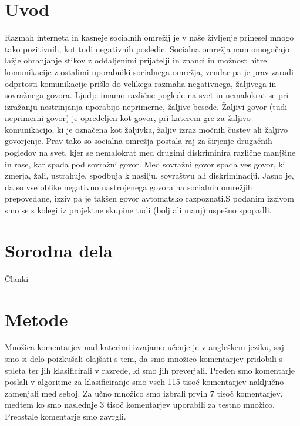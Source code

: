 \documentclass{acm_proc_article-sp}
\begin{document}

\section{Uvod}
Razmah interneta in kasneje socialnih omrežij je v naše življenje prinesel mnogo tako pozitivnih, kot tudi negativnih posledic. Socialna omrežja nam omogočajo lažje ohranjanje stikov z oddaljenimi prijatelji in znanci in možnost hitre komunikacije z ostalimi uporabniki socialnega omrežja, vendar pa je prav zaradi odprtosti komunikacije prišlo do velikega razmaha negativnega, žaljivega in sovražnega govora. Ljudje imamo različne poglede na svet in nemalokrat se pri izražanju nestrinjanja uporabijo neprimerne, žaljive besede. Žaljivi govor (tudi neprimerni govor) je opredeljen kot govor, pri katerem gre za žaljivo komunikacijo, ki je označena kot žaljivka, žaljiv izraz močnih čustev ali žaljivo govorjenje. Prav tako so socialna omrežja postala raj za širjenje drugačnih pogledov na svet, kjer se nemalokrat med drugimi diskriminira različne manjšine in rase, kar spada pod sovražni govor.  Med sovražni govor spada ves govor, ki zmerja, žali, ustrahuje, spodbuja k nasilju, sovraštvu ali diskriminaciji. Jasno je, da so vse oblike negativno nastrojenega govora na socialnih omrežjih prepovedane, izziv pa je takšen govor avtomatsko razpoznati.S podanim izzivom smo se s kolegi iz projektne skupine tudi (bolj ali manj) uspešno spopadli.

\section{Sorodna dela}
Članki~\cite{Burnap2016, Chen:2012:DOL:2411131.2411739, POI3:POI385}

\section{Metode}
Množica komentarjev nad katerimi izvajamo učenje je v angleškem jeziku, saj smo si delo poizkušali olajšati s tem, da smo množico komentarjev pridobili s spleta ter jih klasificirali v razrede, ki smo jih preverjali. Preden smo komentarje poslali v algoritme za klasificiranje smo vseh 115 tisoč komentarjev naključno zamenjali med seboj. Za učno množico smo izbrali prvih 7 tisoč komentarjev, medtem ko smo naslednje 3 tisoč komentarjev uporabili za testno množico. Preostale komentarje smo zavrgli.
\end{document}
